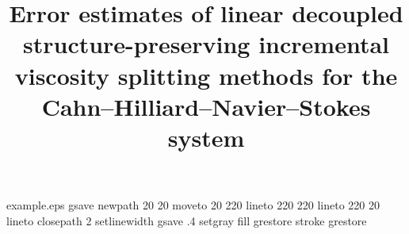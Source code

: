\begin{filecontents*}{example.eps}
	gsave
	newpath
	20 20 moveto
	20 220 lineto
	220 220 lineto
	220 20 lineto
	closepath
	2 setlinewidth
	gsave
	.4 setgray fill
	grestore
	stroke
	grestore
\end{filecontents*}
%
\RequirePackage{fix-cm}
\documentclass{svjour3}                     %
%
\smartqed  %
%
\usepackage{mathptmx}      %
\usepackage{amsmath,amssymb,amsfonts}%
\usepackage{graphicx}
\usepackage{subfigure}
\usepackage{stmaryrd}
\usepackage[T1]{fontenc}
\usepackage{latexsym,mathrsfs}
\usepackage{float}
\usepackage{xcolor}
\usepackage{algorithm, algorithmic}
\usepackage{array,bm}
\usepackage[colorlinks,linkcolor=blue, anchorcolor=blue, citecolor=blue]{hyperref}
%
\usepackage{color,caption,cases}
\usepackage{tabularx,booktabs }
\usepackage{indentfirst}
\usepackage{appendix}
\usepackage[numbers,sort&compress]{natbib}
\newcommand{\malA}{\mathcal{A}}
\newcommand{\malB}{\mathcal{B}}
\newcommand{\malC}{\mathcal{C}}
\newcommand{\malD}{\mathcal{D}}
\newcommand{\malM}{\mathcal{M}}
\newcommand{\malE}{\mathcal{E}}
\newcommand{\malF}{\mathcal{F}}
\newcommand{\malO}{\mathcal{O}}
\newcommand{\mbfH}{\mathbf{H}}
\newcommand{\mbfL}{\mathbf{L}}
\newcommand{\mbfV}{\mathbf{V}}
\newcommand{\ds}{\displaystyle}
\newcommand{\f}{\frac}
\newcommand{\p}{\partial}


\title{Error estimates of linear decoupled structure-preserving incremental viscosity splitting methods for the Cahn--Hilliard--Navier--Stokes system} %
%	

